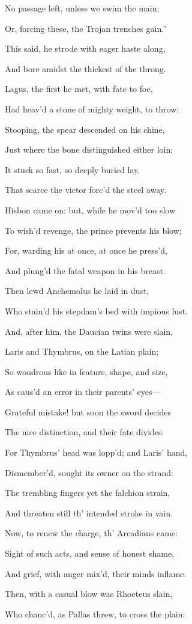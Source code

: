 No passage left, unless we swim the main;

Or, forcing these, the Trojan trenches gain.”

This said, he strode with eager haste along,

And bore amidst the thickest of the throng.

Lagus, the first he met, with fate to foe,

Had heav’d a stone of mighty weight, to throw:

Stooping, the spear descended on his chine,

Just where the bone distinguished either loin:

It stuck so fast, so deeply buried lay,

That scarce the victor forc’d the steel away.

Hisbon came on: but, while he mov’d too slow

To wish’d revenge, the prince prevents his blow;

For, warding his at once, at once he press’d,

And plung’d the fatal weapon in his breast.

Then lewd Anchemolus he laid in dust,

Who stain’d his stepdam’s bed with impious lust.

And, after him, the Daucian twins were slain,

Laris and Thymbrus, on the Latian plain;

So wondrous like in feature, shape, and size,

As caus’d an error in their parents’ eyes—

Grateful mistake! but soon the sword decides

The nice distinction, and their fate divides:

For Thymbrus’ head was lopp’d; and Laris’ hand,

Dismember’d, sought its owner on the strand:

The trembling fingers yet the falchion strain,

And threaten still th’ intended stroke in vain.

Now, to renew the charge, th’ Arcadians came:

Sight of such acts, and sense of honest shame,

And grief, with anger mix’d, their minds inflame.

Then, with a casual blow was Rhoeteus slain,

Who chanc’d, as Pallas threw, to cross the plain:


